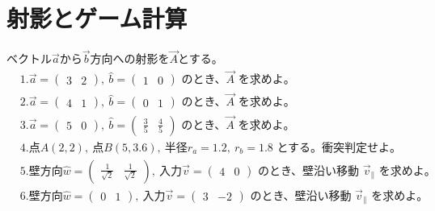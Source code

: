\documentclass[paper=b4j,landscape,twocolumn,fleqn]{jlreq}
\begin{document}
\section{射影とゲーム計算}
ベクトル\(\vec{a}\)から\(\vec{b}\)方向への射影を\(\vec{A}\)とする。
\begin{align*}
　&1.　\vec{a}=\begin{pmatrix}3 & 2\end{pmatrix},\ \hat{b}=\begin{pmatrix}1 & 0\end{pmatrix}\text{ のとき、}\vec{A}\text{ を求めよ。}\\[0.45em]
　&2.　\vec{a}=\begin{pmatrix}4 & 1\end{pmatrix},\ \hat{b}=\begin{pmatrix}0 & 1\end{pmatrix}\text{ のとき、}\vec{A}\text{ を求めよ。}\\[0.45em]
　&3.　\vec{a}=\begin{pmatrix}5 & 0\end{pmatrix},\ \hat{b}=\begin{pmatrix}\frac{3}{5} & \frac{4}{5}\end{pmatrix}\text{ のとき、}\vec{A}\text{ を求めよ。}\\[0.45em]
　&4.　点A(2,2),\ 点B(5,3.6),\ 半径r_a=1.2,\ r_b=1.8\text{ とする。衝突判定せよ。}\\[0.45em]
　&5.　壁方向 \hat{w}=\begin{pmatrix}\frac{1}{\sqrt{2}} & \frac{1}{\sqrt{2}}\end{pmatrix},\ 入力\vec{v}=\begin{pmatrix}4 & 0\end{pmatrix}\text{ のとき、壁沿い移動 }\vec{v}_{\parallel}\text{ を求めよ。}\\[0.45em]
　&6.　壁方向 \hat{w}=\begin{pmatrix}0 & 1\end{pmatrix},\ 入力\vec{v}=\begin{pmatrix}3 & -2\end{pmatrix}\text{ のとき、壁沿い移動 }\vec{v}_{\parallel}\text{ を求めよ。}\\[0.45em]
\end{align*}
\end{document}
